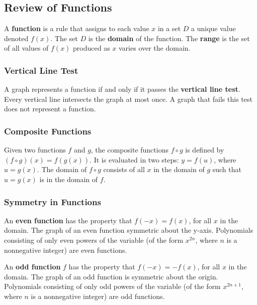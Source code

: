 %
%
%

\subsection{Review of Functions}
A \textbf{function} is a rule that assigns to each value $x$ in a set $D$ a unique value denoted $f(x)$. The set $D$ is the \textbf{domain} of the function. The \textbf{range} is the set of all values of $f(x)$ produced as $x$ varies over the domain.

\subsubsection{Vertical Line Test}
A graph represents a function if and only  if it passes the \textbf{vertical line test}. Every vertical line intersects the graph at most once. A graph that fails this test does not represent a function.

\subsubsection{Composite Functions}
Given two functions $f$ and $g$, the composite functions $f \circ g$ is defined by $(f \circ g)(x) = f(g(x))$. It is evaluated in two steps: $y = f(u)$, where $u = g(x)$. The domain of $f \circ g$ consists of all $x$ in the domain of $g$ such that $u = g(x)$ is in the domain of $f$.

\subsubsection{Symmetry in Functions}
An \textbf{even function} has the property that $f(-x) = f(x)$, for all $x$ in the domain. The graph of an even function symmetric about the y-axis. Polynomials consisting of only even powers of the variable (of the form $x^{2n}$, where $n$ is a nonnegative integer) are even functions.

An \textbf{odd function} $f$ has the property that $f(-x) = -f(x)$, for all $x$ in the domain. The graph of an odd function is symmetric about the origin. Polynomials consisting of only odd powers of the variable (of the form $x^{2n + 1}$, where $n$ is a nonnegative integer) are odd functions.